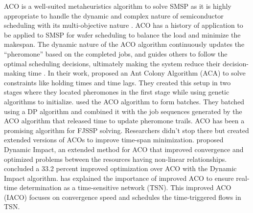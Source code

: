 \documentclass{article}
\begin{document}
\vspace{1em}
ACO is a well-suited metaheuristics algorithm to solve SMSP as it is highly appropriate to handle the dynamic and complex nature of semiconductor scheduling with its multi-objective nature \cite{nayar2021ant}. ACO has a history of application to be applied to SMSP for wafer scheduling to balance the load and minimize the makespan. The dynamic nature of the ACO algorithm continuously updates the “pheromone” based on the completed jobs, and guides others to follow the optimal scheduling decisions, ultimately making the system reduce their decision-making time \cite{zhou2022parameter}.
\vspace{1em}
In their work, \cite{li2024modified} proposed an Ant Colony Algorithm (ACA) to solve constraints like holding times and time lags. They created this setup in two stages where they located pheromones in the first stage while using genetic algorithms to initialize. \cite{shao2010minimising} used the ACO algorithm to form batches. They batched using a DP algorithm and combined it with the job sequences generated by the ACO algorithm that released time to update pheromone trails. 
\vspace{1em}
ACO has been a promising algorithm for FJSSP solving. Researchers didn’t stop there but created extended versions of ACOs to improve time-span minimization. \cite{skackauskas2022dynamic} proposed Dynamic Impact, an extended method for ACO that improved convergence and optimized problems between the resources having non-linear relationships. \cite{skackauskas2022dynamic} concluded a 33.2 percent improved optimization over ACO with the Dynamic Impact algorithm. 
\vspace{1em}
\cite{wang2021time} has explained the importance of improved ACO to ensure real-time determination as a time-sensitive network (TSN). This improved ACO (IACO) focuses on convergence speed and schedules the time-triggered flows in TSN.
\printbibliography %
\end{document}
